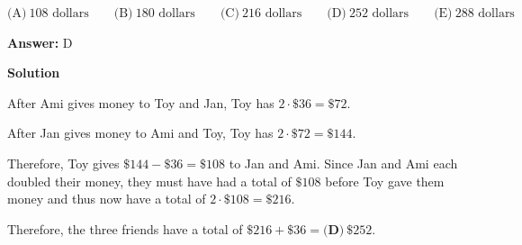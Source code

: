 \begin{enumerate}
 $\text{(A)}\ 108\text{ dollars} \qquad \text{(B)}\ 180\text{ dollars} \qquad \text{(C)}\ 216\text{ dollars} \qquad \text{(D)}\ 252\text{ dollars} \qquad \text{(E)}\ 288\text{ dollars}$

 \textbf{Answer: }D



\textbf{Solution}

After Ami gives money to Toy and Jan, Toy has $2 \cdot \$36 = \$72$.

 After Jan gives money to Ami and Toy, Toy has $2 \cdot \$72 = \$144$.

 Therefore, Toy gives $\$144 - \$36 = \$108$ to Jan and Ami.  Since Jan and Ami each doubled their money, they must have had a total of $\$108$ before Toy gave them money and thus now have a total of $2 \cdot \$108 = \$216$.  

 Therefore, the three friends have a total of $\$216 + \$36 = \boxed{\textbf{(D)}\ \$252}$.

 


\end{enumerate}